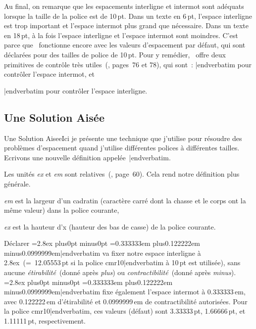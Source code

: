 \ii Au final, on remarque que les espacements interligne et intermot sont ad\'equats lorsque la taille de la police est de 10\,pt. Dans un texte en 6\,pt, l'espace interligne est trop important et l'espace intermot plus grand que n\'ecessaire. Dans un texte en 18\,pt, \`a la fois l'espace interligne et l'espace intermot sont moindres. C'est parce que \capstex\ fonctionne encore avec les valeurs d'espacement par d\'efaut, qui sont d\'eclar\'ees pour des tailles de police de 10\,pt. Pour y rem\'edier, \capstex\ offre deux primitives de contr\^ole tr\`es utiles~(\cite{knuth_texbook}, pages~76 et 78), qui sont~:\ms
{\color{brown}\verbatim \spaceskip|endverbatim} pour contr\^oler l'espace intermot, et

{\color{brown}\verbatim \baselineskip|endverbatim} pour contr\^oler l'espace interligne.




\subsection{Une Solution Ais\'ee}{Une Solution Aisee}Ici je pr\'esente une technique que j'utilise pour r\'esoudre des probl\`emes d'espacement quand j'utilise diff\'erentes polices \`a diff\'erentes tailles. Ecrivons une nouvelle d\'efinition appel\'ee~{\color{brown}\verbatim \fontspacing|endverbatim}.\ms

\sk
             \def\fontspacing{\baselineskip=2.8ex plus0pt minus0pt
             \spaceskip=0.333333em plus0.122222em minus0.0999999em}

\ii Les unit\'es {\sl ex\/} et {\sl em\/} sont relatives~(\cite{knuth_texbook}, page~60). Cela rend notre d\'efinition plus g\'en\'erale.\ms

{\sl em\/} est la largeur d'un cadratin (caract\`ere carr\'e dont la chasse et le corps ont la m\^eme
valeur) dans la police courante,

{\sl ex\/} est la hauteur d'x (hauteur des bas de casse) de la police courante.\sk

\ii D\'eclarer {\color{brown}\verbatim \fontspacing|endverbatim} va fixer notre espace interligne \`a 2.8ex~(=~12.05553\,pt si la police {\verbatim cmr10|endverbatim} \`a 10\,pt est utilis\'ee), sans aucune {\sl \'etirabilit\'e\/}~(donn\'e apr\`es {\sl plus\/}) ou {\sl contractibilit\'e}~(donn\'e apr\`es {\sl minus\/}). {\color{brown}\verbatim \fontspacing|endverbatim} fixe \'egalement l'espace intermot \`a 0.333333\,em, avec 0.122222\,em d'\'etirabilit\'e et 0.0999999\,em de contractibilit\'e autoris\'ees. Pour la police {\verbatim cmr10|endverbatim}, ces valeurs (d\'efaut) sont 3.33333\,pt, 1.66666\,pt, et 1.11111\,pt, respectivement.

